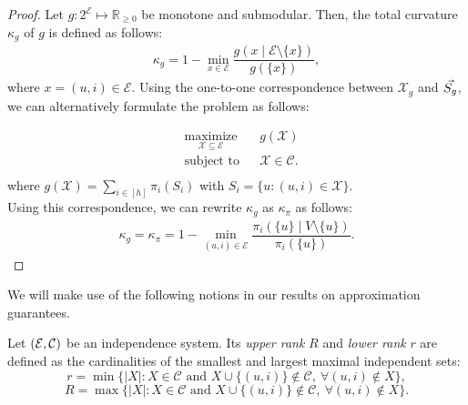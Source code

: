 \begin{proof}
Let $g : 2^{\mathcal{E}} \mapsto \mathbb{R}_{\ge 0}$ be monotone and submodular. %
Then, the total curvature $\kappa_g$ of $g$ is defined as follows:
\begin{align*}
\kappa_g = 1 - \underset{x \in \mathcal{E}} {\min} \dfrac{g(x \mid \mathcal{E} \setminus\{x\} )}{g(\{x\})},
\end{align*}
where $x = (u,i) \in \mathcal{E}$. Using the one-to-one correspondence between $\mathcal{X}_g$ and $\vec{S_g}$, we can alternatively formulate the \RM problem as follows:

\begin{equation*}
\begin{aligned}
& \underset{\mathcal{X} \subseteq \mathcal{E}}{\text{maximize}}
& & g(\mathcal{X}) \\
& \text{subject to}
& & \mathcal{X} \in \mathcal{C}.  \\
\end{aligned}
\end{equation*}
where $g(\mathcal{X}) = \sum_{i \in [h]} \pi_i(S_i)$ with $S_i = \{ u : (u,i) \in \mathcal{X} \}$. \\

Using this correspondence, we can rewrite $\kappa_g$ as $\kappa_{\pi}$ as follows:
\begin{align*}
\kappa_g = \kappa_{\pi} = 1 - \underset{(u,i) \in \mathcal{E}} {\min} \dfrac{\pi_i(\{u\} \mid V \setminus\{u\})}{\pi_i(\{u\})}.
\end{align*}
\end{proof}
We will make use of the following notions in our results on approximation guarantees.
%
\begin{definition}
Let $({\cal E}, {\cal C})$ be an independence system. Its \emph{upper rank} $R$ and \emph{lower rank} $r$ are defined as the cardinalities of the smallest and largest maximal independent sets:
$$r = \min \{|X| : X \in \mathcal{C} \text{ and } X \cup \{(u,i)\} \not\in \mathcal{C}, ~\forall (u,i) \not\in X\}, $$
$$R = \max \{|X| : X \in \mathcal{C} \text{ and } X \cup \{(u,i)\} \not\in \mathcal{C}, ~\forall (u,i) \not\in X\}.$$
\end{definition}

